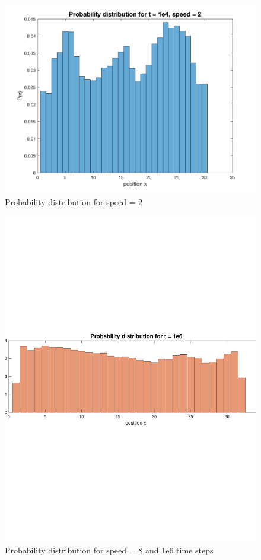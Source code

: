 \documentclass[11pt,letterpaper]{article}
\begin{document}
\begin{figure}
\centering
\includegraphics[width=0.9\linewidth]{./prob_2_1e4}
\caption{Probability distribution for speed = 2}
\label{fig:prob_2}
\end{figure}

\begin{figure}
\centering
\includegraphics[width=0.9\linewidth]{./prob_1e6}
\caption{Probability distribution for speed = 8 and 1e6 time steps}
\label{fig:prob_8}
\end{figure}
\end{document}
